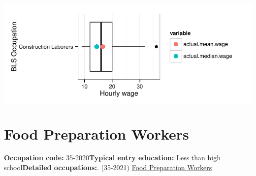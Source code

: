 \documentclass[a4paper,10pt]{article}\usepackage[]{graphicx}\usepackage[]{color}
\makeatletter
\def\maxwidth{ %
  \ifdim\Gin@nat@width>\linewidth
    \linewidth
  \else
    \Gin@nat@width
  \fi
}
\makeatother
\begin{document}
{\centering \includegraphics[width=\maxwidth]{figure/unnamed-chunk-236} 

}


\newpage\section{Food Preparation Workers}\textbf{Occupation code:} 35-2020\newline\textbf{Typical entry education:} Less than high school\newline\textbf{Detailed occupations:}. (35-2021)  \href{http://www.bls.gov/oes/current/oes352021.htm}{Food Preparation Workers}\newline%
\end{document}
